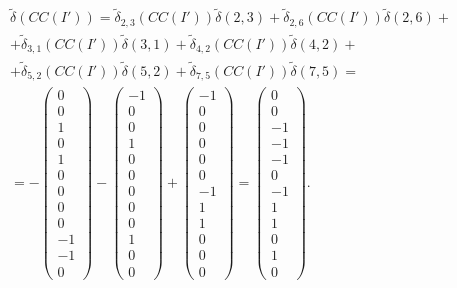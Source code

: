 \documentclass[a4paper,14pt,usenames,dvipsnames]{extreport}
\begin{document}
\begin{gather*}
\tilde{\delta}(CC(I')) = 
\tilde{\delta}_{2,3}(CC(I')) \tilde{\delta}(2,3) + \tilde{\delta}_{2,6}(CC(I')) \tilde{\delta}(2,6) + \\ + 
\tilde{\delta}_{3,1}(CC(I')) \tilde{\delta}(3,1) + \tilde{\delta}_{4,2}(CC(I')) \tilde{\delta}(4,2) + \\ +
\tilde{\delta}_{5,2}(CC(I')) \tilde{\delta}(5,2) +
\tilde{\delta}_{7,5}(CC(I')) \tilde{\delta}(7,5) = \\
= -\begin{pmatrix}
0 \\ 
0 \\ 
1 \\ 
0 \\ 
1 \\ 
0 \\
0 \\
0 \\
0 \\
-1 \\
-1 \\
0
\end{pmatrix} -
\begin{pmatrix}
-1 \\ 
0 \\ 
0 \\ 
1 \\ 
0 \\ 
0 \\
0 \\
0 \\
0 \\
1 \\
0 \\
0
\end{pmatrix} +
\begin{pmatrix}
-1 \\ 
0 \\ 
0 \\ 
0 \\ 
0 \\ 
0 \\
-1 \\
1 \\
1 \\
0 \\
0 \\
0
\end{pmatrix} = \begin{pmatrix}
0 \\ 
0 \\ 
-1 \\ 
-1 \\ 
-1 \\ 
0 \\
-1 \\
1 \\
1 \\
0 \\
1 \\
0
\end{pmatrix}.
\end{gather*}
\end{document}
